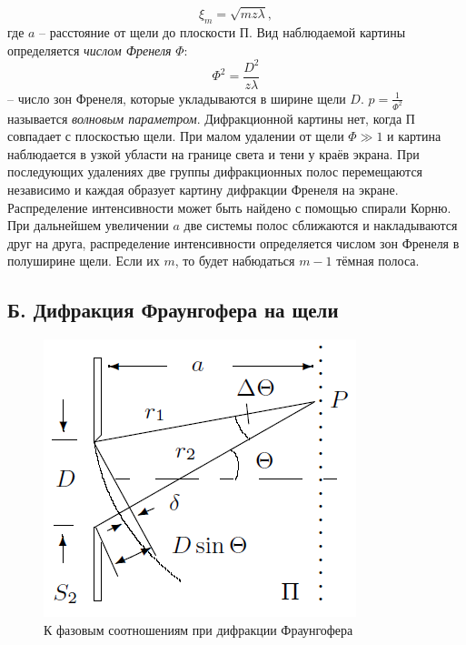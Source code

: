 \documentclass[12pt, a4paper]{article}
\begin{document}
\begin{equation}
  \xi_m = \sqrt{mz\lambda},
\end{equation}
где $a$ -- расстояние от щели до плоскости П. Вид наблюдаемой картины определяется \textit{числом Френеля} $\Phi$:
$$
  \Phi^2 = \dfrac{D^2}{z\lambda}
$$
-- число зон Френеля, которые укладываются в ширине щели $D$. $p = \frac{1}{\Phi^2}$ называется \textit{волновым параметром}. Дифракционной картины нет, когда П совпадает с плоскостью щели. При малом удалении от щели $\Phi \gg 1$ и картина наблюдается в узкой убласти на границе света и тени у краёв экрана. При последующих удалениях две группы дифракционных полос перемещаются независимо и каждая образует картину дифракции Френеля на экране. Распределение интенсивности может быть найдено с помощью спирали Корню. При дальнейшем увеличении $a$ две системы полос сближаются и накладываются друг на друга, распределение интенсивности определяется числом зон Френеля в полуширине щели. Если их $m$, то будет набюдаться $m-1$ тёмная полоса.

\subsection*{Б. Дифракция Фраунгофера на щели}

\begin{figure}
  \vspace{-12mm}
  \begin{center}
    \includegraphics[width = 0.85\linewidth]{pics/1.png}
  \end{center}
  \caption{К фазовым соотношениям при дифракции Фраунгофера}
  \label{pic:fresnel}
\end{figure}
\end{document}
